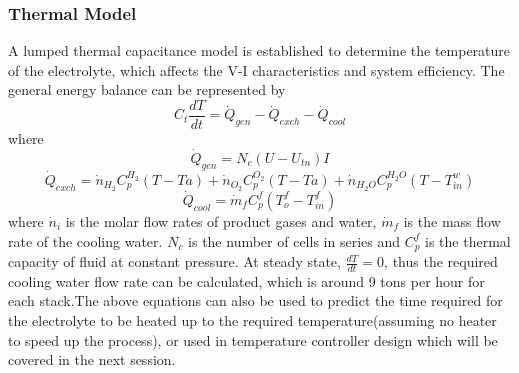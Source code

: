 \subsubsection{Thermal Model}
A lumped thermal capacitance model is established to determine the temperature of the electrolyte, which affects the V-I characteristics and system efficiency. The general energy balance can be represented by
\begin{equation}
C_t\frac{dT}{dt} = \dot{Q}_{gen}- \dot{Q}_{exch}-\dot{Q}_{cool}
\end{equation}
where 
\begin{equation}
\dot{Q}_{gen} = N_c(U-U_{tn})I 
\end{equation}
\begin{equation}
\dot{Q}_{exch} = \dot{n}_{H_2} C_p^{H_2}(T - Ta) + \dot{n}_{O_2}C_p^{O_2}(T - Ta)+ \dot{n}_{H_2O}C_p^{H_2O}(T - T_{in}^w)
\end{equation}
\begin{equation}
\dot{Q}_{cool} = \dot{m}_fC_p^f(T_o^f - T_{in}^f) 
\end{equation}
where $\dot{n}_i$ is the molar flow rates of product gases and water, $\dot{m}_f$ is the mass flow rate of the cooling water. $N_c$ is the number of cells in series and $C_p^f$ is the thermal capacity of fluid at constant pressure. At steady state, $\frac{dT}{dt} = 0$,  thus the required cooling water flow rate can be calculated, which is around 9 tons per hour for each stack.The above equations can also be used to predict the time required for the electrolyte to be heated up to the required temperature(assuming no heater to speed up the process), or used in temperature controller design which will be covered in the next session.

